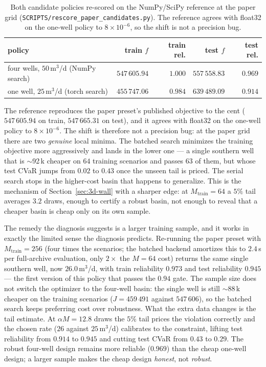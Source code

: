 \begin{table}[t]
  \centering
  \caption{Both candidate policies re-scored on the NumPy/SciPy reference at
    the paper grid (\texttt{SCRIPTS/rescore\_paper\_candidates.py}). The
    reference agrees with float32 on the one-well policy to $8\times10^{-6}$,
    so the shift is not a precision bug.}
  \label{tab:3d-rescore}
  \begin{tabular}{@{}lrrrr@{}}
    \toprule
    policy & train $f$ & train rel. & test $f$ & test rel. \\
    \midrule
    four wells, $50$\,m$^3$/d (NumPy search) & $547\,605.94$ & $1.000$ & $557\,558.83$ & $0.969$ \\
    one well, $25$\,m$^3$/d (torch search) & $455\,747.06$ & $0.984$ & $639\,489.09$ & $0.914$ \\
    \bottomrule
  \end{tabular}
\end{table}

The reference reproduces the paper preset's published objective to the cent
($547\,605.94$ on train, $547\,665.31$ on test), and it agrees with float32 on
the one-well policy to $8\times10^{-6}$. The shift is therefore not a precision
bug: at the paper grid there are two \emph{genuine} local minima. The batched
search minimizes the training objective more aggressively and lands in the lower
one --- a single southern well that is $\sim$92\,k cheaper on $64$ training
scenarios and passes $63$ of them, but whose test CVaR jumps from $0.02$ to
$0.43$ once the unseen tail is priced. The serial search stops in the
higher-cost basin that happens to generalize. This is the mechanism of
Section~\ref{sec:3d-wall} with a sharper edge: at $M_{\text{train}}=64$ a $5\%$
tail averages $3.2$ draws, enough to certify a robust basin, not enough to
reveal that a cheaper basin is cheap only on its own sample.

The remedy the diagnosis suggests is a larger training sample, and it works in
exactly the limited sense the diagnosis predicts. Re-running the paper preset
with $M_{\text{train}}=256$ (four times the scenarios; the batched backend
amortizes this to $2.4$\,s per full-archive evaluation, only $2\times$ the
$M=64$ cost) returns the same single southern well, now $26.0$\,m$^3$/d, with
train reliability $0.973$ and test reliability $0.945$ --- the first version of
this policy that passes the $0.94$ gate. The sample size does not switch the
optimizer to the four-well basin: the single well is still $\sim$88\,k cheaper
on the training scenarios ($J=459\,491$ against $547\,606$), so the batched
search keeps preferring cost over robustness. What the extra data changes is the
tail estimate. At $\alpha M = 12.8$ draws the $5\%$ tail prices the violation
correctly and the chosen rate ($26$ against $25$\,m$^3$/d) calibrates to the
constraint, lifting test reliability from $0.914$ to $0.945$ and cutting test
CVaR from $0.43$ to $0.29$. The robust four-well design remains more reliable
($0.969$) than the cheap one-well design; a larger sample makes the cheap
design \emph{honest}, not \emph{robust}.

